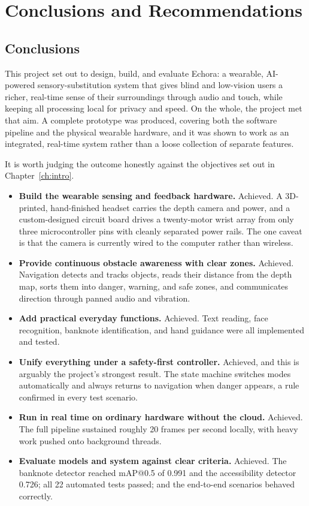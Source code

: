 \chapter{Conclusions and Recommendations}
\label{ch:conclusion}

\section{Conclusions}

This project set out to design, build, and evaluate Echora: a wearable, AI-powered sensory-substitution system that gives blind and low-vision users a richer, real-time sense of their surroundings through audio and touch, while keeping all processing local for privacy and speed. On the whole, the project met that aim. A complete prototype was produced, covering both the software pipeline and the physical wearable hardware, and it was shown to work as an integrated, real-time system rather than a loose collection of separate features.

It is worth judging the outcome honestly against the objectives set out in Chapter~\ref{ch:intro}.

\begin{itemize}
    \item \textbf{Build the wearable sensing and feedback hardware.} Achieved. A 3D-printed, hand-finished headset carries the depth camera and power, and a custom-designed circuit board drives a twenty-motor wrist array from only three microcontroller pins with cleanly separated power rails. The one caveat is that the camera is currently wired to the computer rather than wireless.
    \item \textbf{Provide continuous obstacle awareness with clear zones.} Achieved. Navigation detects and tracks objects, reads their distance from the depth map, sorts them into danger, warning, and safe zones, and communicates direction through panned audio and vibration.
    \item \textbf{Add practical everyday functions.} Achieved. Text reading, face recognition, banknote identification, and hand guidance were all implemented and tested.
    \item \textbf{Unify everything under a safety-first controller.} Achieved, and this is arguably the project's strongest result. The state machine switches modes automatically and always returns to navigation when danger appears, a rule confirmed in every test scenario.
    \item \textbf{Run in real time on ordinary hardware without the cloud.} Achieved. The full pipeline sustained roughly 20 frames per second locally, with heavy work pushed onto background threads.
    \item \textbf{Evaluate models and system against clear criteria.} Achieved. The banknote detector reached mAP@0.5 of 0.991 and the accessibility detector 0.726; all 22 automated tests passed; and the end-to-end scenarios behaved correctly.
\end{itemize}

